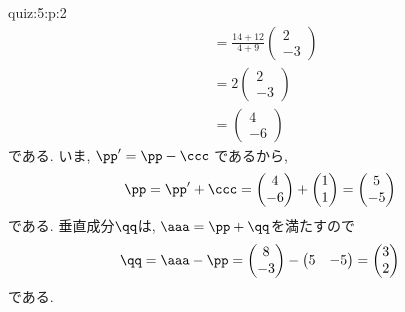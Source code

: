\begin{answerof}{quiz:5:p:2}
\begin{align*}
  &=\frac{14+12}{4+9}\begin{pmatrix}2\\-3\end{pmatrix}\\
      &=2\begin{pmatrix}2\\-3\end{pmatrix}\\
  &=\begin{pmatrix}4\\-6\end{pmatrix}
  \end{align*}
  である.
  いま, $\pp'=\pp-\ccc$
  であるから,
  \begin{align*}
    \pp=\pp'+\ccc=\begin{pmatrix}4\\-6\end{pmatrix}+\begin{pmatrix}1\\1\end{pmatrix}=\begin{pmatrix}5\\-5\end{pmatrix}
  \end{align*}
  である.  
  垂直成分$\qq$は,
  $\aaa=\pp+\qq$を満たすので
  \begin{align*}
    \qq=\aaa-\pp
    =\begin{pmatrix}8\\-3\end{pmatrix}-\begin{pmatrix}5&-5\end{pmatrix}
    =\begin{pmatrix}3\\2\end{pmatrix}
  \end{align*}
  である.



\end{answerof}
